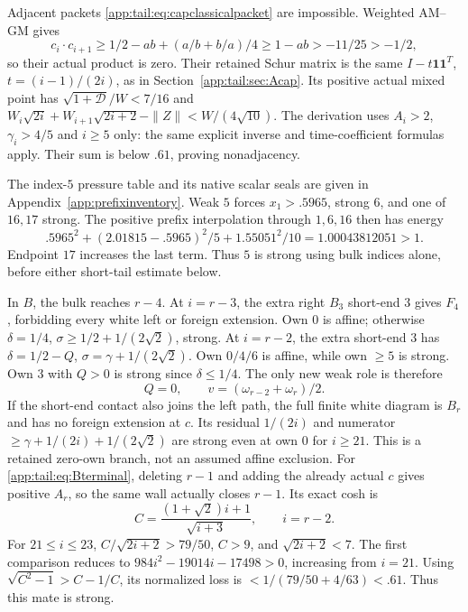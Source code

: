 Adjacent packets \eqref{app:tail:eq:capclassicalpacket} are impossible.
Weighted AM--GM gives
\[
 c_i\cdot c_{i+1}\ge1/2-ab+(a/b+b/a)/4
             \ge1-ab>-11/25>-1/2,
\]
so their actual product is zero. Their retained Schur matrix is the
same $I-t\mathbf1\mathbf1^T$, $t=(i-1)/(2i)$, as in
Section~\ref{app:tail:sec:Acap}. Its positive actual mixed point has
$\sqrt{1+\mathcal D}/W<7/16$ and
$W_i\sqrt{2i}+W_{i+1}\sqrt{2i+2}-\|Z\|<W/(4\sqrt{10})$.
The derivation uses $A_i>2$, $\gamma_i>4/5$ and $i\ge5$ only:
the same explicit inverse and time-coefficient formulas apply.
Their sum is below $.61$, proving nonadjacency.

The index-$5$ pressure table and its native scalar seals are given
in Appendix~\ref{app:prefixinventory}. Weak $5$ forces $x_1>.5965$, strong
$6$, and one of $16,17$ strong. The positive prefix interpolation
through $1,6,16$ then has energy
\begin{equation}\label{app:tail:eq:capbootstrap}
 .5965^2+(2.01815-.5965)^2/5+1.55051^2/10
       =1.00043812051>1.
\end{equation}
Endpoint $17$ increases the last term. Thus $5$ is strong using
bulk indices alone, before either short-tail estimate below.

In $B$, the bulk reaches $r-4$. At $i=r-3$, the extra right $B_3$
short-end $3$ gives $F_4$, forbidding every white left or foreign
extension. Own $0$ is affine; otherwise
$\delta=1/4$, $\sigma\ge1/2+1/(2\sqrt2)$, strong.
At $i=r-2$, the extra short-end $3$ has
$\delta=1/2-Q$, $\sigma=\gamma+1/(2\sqrt2)$.
Own $0/4/6$ is affine, while own $\ge5$ is strong.
Own $3$ with $Q>0$ is strong since $\delta\le1/4$.
The only new weak role is therefore
\begin{equation}\label{app:tail:eq:Bterminal}
 Q=0,\qquad v=(\omega_{r-2}+\omega_r)/2.
\end{equation}
If the short-end contact also joins the left path, the full finite
white diagram is $B_r$ and has no foreign extension at $c$.
Its residual $1/(2i)$ and numerator
$\ge\gamma+1/(2i)+1/(2\sqrt2)$ are strong even at own $0$
for $i\ge21$. This is a retained zero-own branch, not an assumed
affine exclusion.
For \eqref{app:tail:eq:Bterminal}, deleting $r-1$ and adding the already
actual $c$ gives positive $A_r$, so the same wall actually closes
$r-1$. Its exact cosh is
\[
 C=\frac{(1+\sqrt2)i+1}{\sqrt{i+3}},\qquad i=r-2.
\]
For $21\le i\le23$, $C/\sqrt{2i+2}>79/50$, $C>9$, and
$\sqrt{2i+2}<7$. The first comparison reduces to
$984i^2-19014i-17498>0$, increasing from $i=21$.
Using $\sqrt{C^2-1}>C-1/C$, its normalized loss is
$<1/(79/50+4/63)<.61$. Thus this mate is strong.

